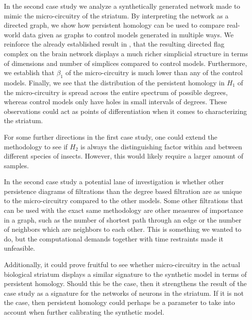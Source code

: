 In the second case study we analyze a synthetically generated network made to mimic the micro-circuitry of the striatum. By interpreting the network as a directed graph, we show how persistent homology can be used to compare real-world data given as graphs to control models generated in multiple ways. We reinforce the already established result in \cite{reimann}, that the resulting directed flag complex on the brain network displays a much richer simplicial structure in terms of dimensions and number of simplices compared to control models. Furthermore, we establish that $\beta_{1}$ of the micro-circuitry is much lower than any of the control models. Finally, we see that the distribution of the persistent homology in $H_{1}$ of the micro-circuitry is spread across the entire spectrum of possible degrees, whereas control models only have holes in small intervals of degrees. These observations could act as points of differentiation when it comes to characterizing the striatum.

For some further directions in the first case study, one could extend the methodology to see if $H_{2}$ is always the distinguishing factor within and between different species of insects. However, this would likely require a larger amount of samples.

In the second case study a potential lane of investigation is whether other persistence diagrams of filtrations than the degree based filtration are as unique to the micro-circuitry compared to the other models. Some other filtrations that can be used with the exact same methodology are other measures of importance in a graph, such as the number of shortest path through an edge or the number of neighbors which are neighbors to each other. This is something we wanted to do, but the computational demands together with time restraints made it unfeasible.

Additionally, it could prove fruitful to see whether micro-circuitry in the actual biological striatum displays a similar signature to the synthetic model in terms of persistent homology. Should this be the case, then it strengthens the result of the case study as a signature for the networks of neurons in the striatum. If it is not the case, then persistent homology could perhaps be a parameter to take into account when further calibrating the synthetic model.

